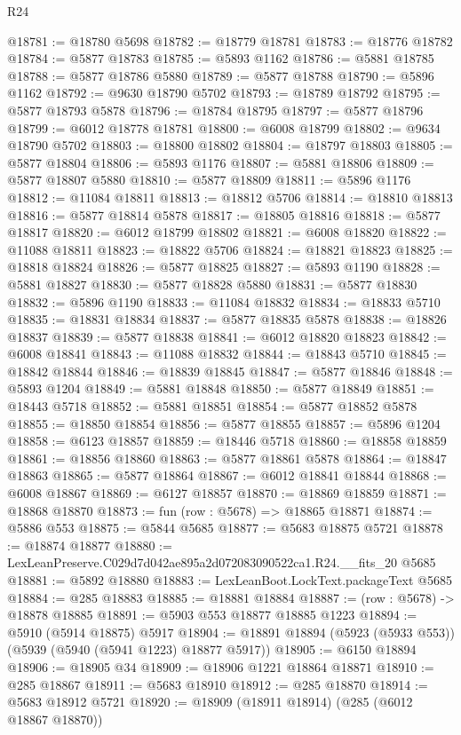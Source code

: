 \begin{lexlean}{R24}
\begin{coremodule}
@18781 := @18780 @5698
@18782 := @18779 @18781
@18783 := @18776 @18782
@18784 := @5877 @18783
@18785 := @5893 @1162
@18786 := @5881 @18785
@18788 := @5877 @18786 @5880
@18789 := @5877 @18788
@18790 := @5896 @1162
@18792 := @9630 @18790 @5702
@18793 := @18789 @18792
@18795 := @5877 @18793 @5878
@18796 := @18784 @18795
@18797 := @5877 @18796
@18799 := @6012 @18778 @18781
@18800 := @6008 @18799
@18802 := @9634 @18790 @5702
@18803 := @18800 @18802
@18804 := @18797 @18803
@18805 := @5877 @18804
@18806 := @5893 @1176
@18807 := @5881 @18806
@18809 := @5877 @18807 @5880
@18810 := @5877 @18809
@18811 := @5896 @1176
@18812 := @11084 @18811
@18813 := @18812 @5706
@18814 := @18810 @18813
@18816 := @5877 @18814 @5878
@18817 := @18805 @18816
@18818 := @5877 @18817
@18820 := @6012 @18799 @18802
@18821 := @6008 @18820
@18822 := @11088 @18811
@18823 := @18822 @5706
@18824 := @18821 @18823
@18825 := @18818 @18824
@18826 := @5877 @18825
@18827 := @5893 @1190
@18828 := @5881 @18827
@18830 := @5877 @18828 @5880
@18831 := @5877 @18830
@18832 := @5896 @1190
@18833 := @11084 @18832
@18834 := @18833 @5710
@18835 := @18831 @18834
@18837 := @5877 @18835 @5878
@18838 := @18826 @18837
@18839 := @5877 @18838
@18841 := @6012 @18820 @18823
@18842 := @6008 @18841
@18843 := @11088 @18832
@18844 := @18843 @5710
@18845 := @18842 @18844
@18846 := @18839 @18845
@18847 := @5877 @18846
@18848 := @5893 @1204
@18849 := @5881 @18848
@18850 := @5877 @18849
@18851 := @18443 @5718
@18852 := @5881 @18851
@18854 := @5877 @18852 @5878
@18855 := @18850 @18854
@18856 := @5877 @18855
@18857 := @5896 @1204
@18858 := @6123 @18857
@18859 := @18446 @5718
@18860 := @18858 @18859
@18861 := @18856 @18860
@18863 := @5877 @18861 @5878
@18864 := @18847 @18863
@18865 := @5877 @18864
@18867 := @6012 @18841 @18844
@18868 := @6008 @18867
@18869 := @6127 @18857
@18870 := @18869 @18859
@18871 := @18868 @18870
@18873 := fun (row : @5678) => @18865 @18871
@18874 := @5886 @553
@18875 := @5844 @5685
@18877 := @5683 @18875 @5721
@18878 := @18874 @18877
@18880 := LexLeanPreserve.C029d7d042ae895a2d072083090522ca1.R24.__fits_20 @5685
@18881 := @5892 @18880
@18883 := LexLeanBoot.LockText.packageText @5685
@18884 := @285 @18883
@18885 := @18881 @18884
@18887 := (row : @5678) -> @18878 @18885
@18891 := @5903 @553 @18877 @18885 @1223
@18894 := @5910 (@5914 @18875) @5917
@18904 := @18891 @18894 (@5923 (@5933 @553)) (@5939 (@5940 (@5941 @1223) @18877 @5917))
@18905 := @6150 @18894
@18906 := @18905 @34
@18909 := @18906 @1221 @18864 @18871
@18910 := @285 @18867
@18911 := @5683 @18910
@18912 := @285 @18870
@18914 := @5683 @18912 @5721
@18920 := @18909 (@18911 @18914) (@285 (@6012 @18867 @18870))

\end{coremodule}
\end{lexlean}
